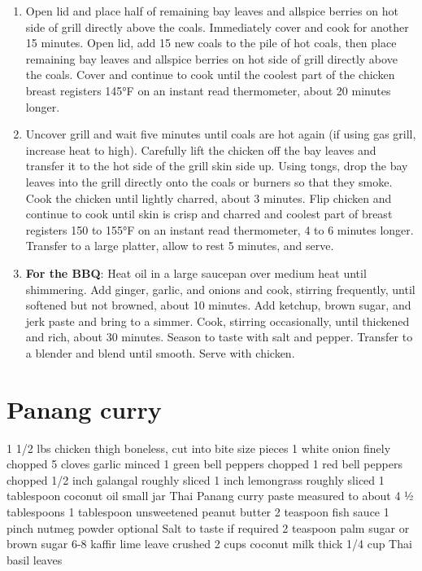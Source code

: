 \documentclass[]{article}
\begin{document}
\begin{enumerate}
\item
  Open lid and place half of remaining bay leaves and allspice berries on hot side of grill directly above the coals. Immediately cover and cook for another 15 minutes. Open lid, add 15 new coals to the pile of hot coals, then place remaining bay leaves and allspice berries on hot side of grill directly above the coals. Cover and continue to cook until the coolest part of the chicken breast registers 145°F on an instant read thermometer, about 20 minutes longer.
\item
  Uncover grill and wait five minutes until coals are hot again (if using gas grill, increase heat to high). Carefully lift the chicken off the bay leaves and transfer it to the hot side of the grill skin side up. Using tongs, drop the bay leaves into the grill directly onto the coals or burners so that they smoke. Cook the chicken until lightly charred, about 3 minutes. Flip chicken and continue to cook until skin is crisp and charred and coolest part of breast registers 150 to 155°F on an instant read thermometer, 4 to 6 minutes longer. Transfer to a large platter, allow to rest 5 minutes, and serve.
\item
  \textbf{For the BBQ}: Heat oil in a large saucepan over medium heat until shimmering. Add ginger, garlic, and onions and cook, stirring frequently, until softened but not browned, about 10 minutes. Add ketchup, brown sugar, and jerk paste and bring to a simmer. Cook, stirring occasionally, until thickened and rich, about 30 minutes. Season to taste with salt and pepper. Transfer to a blender and blend until smooth. Serve with chicken.
\end{enumerate}

\hypertarget{panang-curry}{%
\section{Panang curry}\label{panang-curry}}

1 1/2 lbs chicken thigh boneless, cut into bite size pieces
1 white onion finely chopped
5 cloves garlic minced
1 green bell peppers chopped
1 red bell peppers chopped
1/2 inch galangal roughly sliced
1 inch lemongrass roughly sliced
1 tablespoon coconut oil small jar Thai Panang curry paste measured to about 4 ½ tablespoons
1 tablespoon unsweetened peanut butter
2 teaspoon fish sauce
1 pinch nutmeg powder optional
Salt to taste if required
2 teaspoon palm sugar or brown sugar
6-8 kaffir lime leave crushed
2 cups coconut milk thick
1/4 cup Thai basil leaves
\end{document}
